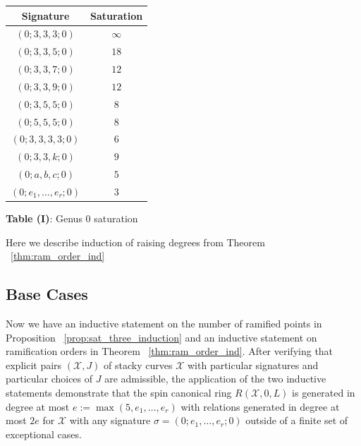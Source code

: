 \documentclass{amsart}
\theoremstyle{plain}
\theoremstyle{definition}
\theoremstyle{remark}
\numberwithin{equation}{section}
\newcommand\ssec{\subsection}
\newcommand \sx{\mathscr X}
\begin{document}
\begin{longtable}
	{| c | c |}
	\hline
	Signature & Saturation \\
	\hline
	\hline

	$(0; 3, 3, 3; 0)$ & $\infty$ \\	\hline

	$(0; 3, 3, 5; 0)$ & $18$ \\	\hline
	
	$(0; 3, 3, 7; 0)$ & $12$ \\	\hline
	
	$(0; 3, 3, 9; 0)$ & $12$ \\	\hline
	
	$(0; 3, 5, 5; 0)$ & $8$ \\	\hline
	
	$(0; 5, 5, 5; 0)$ & $8$ \\	\hline
	
	$(0; 3, 3, 3, 3; 0)$ & $6$ \\	\hline
	
	\hline
	\hline
	
	$(0; 3, 3, k; 0)$ & $9$ \\	\hline
	
	$(0; a, b, c; 0)$ & $5$ \\	\hline
	
	$(0; e_1, \ldots, e_r; 0)$ & $3$ \\	\hline
\end{longtable}

\begin{center}
\textbf{Table (I)}: Genus 0 saturation
\end{center}

Here we describe induction of raising degrees from Theorem ~\ref{thm:ram_order_ind}

\ssec{Base Cases}
\label{ssec:g_0_base}
Now we have an inductive statement on the number of ramified
points in Proposition ~\ref{prop:sat_three_induction} and
an inductive statement on ramification orders in Theorem
~\ref{thm:ram_order_ind}. After verifying that explicit pairs
$(\sx, J)$ of stacky curves $\sx$ with particular signatures and
particular choices of $J$ are admissible, the application of the
two inductive statements demonstrate that the spin canonical ring
$R(\sx , 0, L)$ is generated in degree at most $e := \max(5, e_1,
\ldots, e_r)$ with relations generated in degree at most $2e$ for
$\sx$ with any signature $\sigma = (0; e_1, \ldots , e_r; 0)$ outside
of a finite set of exceptional cases.
\end{document}
